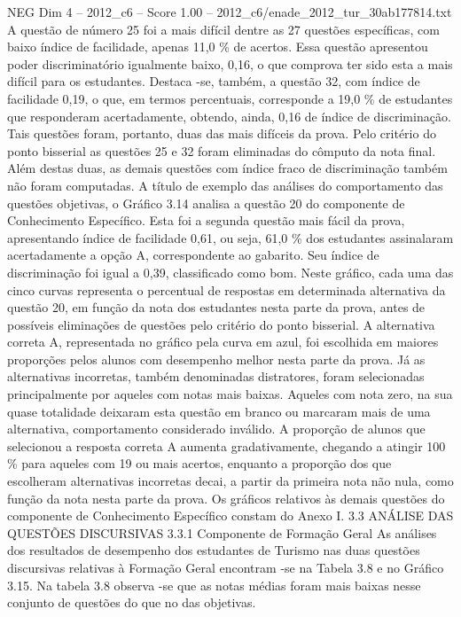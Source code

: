 \begin{textsample}{NEG Dim 4 – 2012\_c6 – Score 1.00 – 2012\_c6/enade\_2012\_tur\_30ab177814.txt}
A questão de número 25 foi a mais difícil dentre as 27 questões específicas, com baixo índice de facilidade, apenas 11,0 \% de acertos.
Essa questão apresentou poder discriminatório igualmente baixo, 0,16, o que comprova ter sido esta a mais difícil para os estudantes.
Destaca -se, também, a questão 32, com índice de facilidade 0,19, o que, em termos percentuais, corresponde a 19,0 \% de estudantes que responderam acertadamente, obtendo, ainda, 0,16 de índice de discriminação.
Tais questões foram, portanto, duas das mais difíceis da prova.
Pelo critério do ponto bisserial as questões 25 e 32 foram eliminadas do cômputo da nota final.
Além destas duas, as demais questões com índice fraco de discriminação também não foram computadas.
A título de exemplo das análises do comportamento das questões objetivas, o Gráfico 3.14 analisa a questão 20 do componente de Conhecimento Específico.
Esta foi a segunda questão mais fácil da prova, apresentando índice de facilidade 0,61, ou seja, 61,0 \% dos estudantes assinalaram acertadamente a opção A, correspondente ao gabarito.
Seu índice de discriminação foi igual a 0,39, classificado como bom.
Neste gráfico, cada uma das cinco curvas representa o percentual de respostas em determinada alternativa da questão 20, em função da nota dos estudantes nesta parte da prova, antes de possíveis eliminações de questões pelo critério do ponto bisserial.
A alternativa correta A, representada no gráfico pela curva em azul, foi escolhida em maiores proporções pelos alunos com desempenho melhor nesta parte da prova.
Já as alternativas incorretas, também denominadas distratores, foram selecionadas principalmente por aqueles com notas mais baixas.
Aqueles com nota zero, na sua quase totalidade deixaram esta questão em branco ou marcaram mais de uma alternativa, comportamento considerado inválido.
A proporção de alunos que selecionou a resposta correta A aumenta gradativamente, chegando a atingir 100 \% para aqueles com 19 ou mais acertos, enquanto a proporção dos que escolheram alternativas incorretas decai, a partir da primeira nota não nula, como função da nota nesta parte da prova.
Os gráficos relativos às demais questões do componente de Conhecimento Específico constam do Anexo I. 3.3 ANÁLISE DAS QUESTÕES DISCURSIVAS 3.3.1 Componente de Formação Geral As análises dos resultados de desempenho dos estudantes de Turismo nas duas questões discursivas relativas à Formação Geral encontram -se na Tabela 3.8 e no Gráfico 3.15.
Na tabela 3.8 observa -se que as notas médias foram mais baixas nesse conjunto de questões do que no das objetivas.

\end{textsample}

